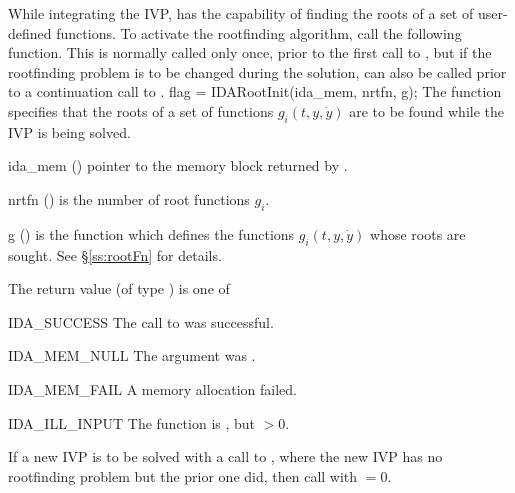 {While integrating the IVP, {\ida} has the capability of finding the
roots of a set of user-defined functions. To activate the rootfinding 
algorithm, call the following function.  This is normally called only
once, prior to the first call to , but if the rootfinding
problem is to be changed during the solution,  can also
be called prior to a continuation call to . 
{
  flag = IDARootInit(ida\_mem, nrtfn, g);
}
{
  The function  specifies that the roots of a set of
  functions $g_i(t,y,\dot{y})$ are to be found while the IVP is being solved.
}
{
  \begin{args}
  \item[ida\_mem] ()
    pointer to the {\ida} memory block returned by .
  \item[nrtfn] ()
    is the number of root functions $g_i$.
  \item[g] ()
    is the {\C} function which defines the  functions $g_i(t,y,\dot{y})$
    whose roots are sought. See \S\ref{ss:rootFn} for details.
 \end{args}
}
{
  The return value  (of type ) is one of
  \begin{args}
  \item[IDA\_SUCCESS]
    The call to  was successful.
  \item[IDA\_MEM\_NULL]
    The  argument was .
  \item[IDA\_MEM\_FAIL]
    A memory allocation failed.
  \item[IDA\_ILL\_INPUT]
    The function  is , but $>0$.
  \end{args}
}
{
  If a new IVP is to be solved with a call to , where the new
  IVP has no rootfinding problem but the prior one did, then call
   with $=0$.
}



}
